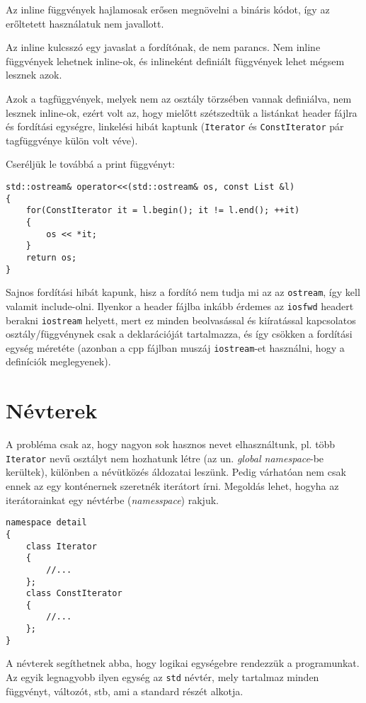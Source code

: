 \documentclass[a4paper,11.5pt,table]{article}
\begin{document}
	\begin{note}
		Az inline függvények hajlamosak erősen megnövelni a bináris kódot, így az erőltetett használatuk nem javallott.
	\end{note}
	\begin{note}
		Az inline kulcsszó egy javaslat a fordítónak, de nem parancs. Nem inline függvények lehetnek inline-ok, és inlineként definiált függvények lehet mégsem lesznek azok.
	\end{note}
	Azok a tagfüggvények, melyek nem az osztály törzsében vannak definiálva, nem lesznek inline-ok, ezért volt az, hogy mielőtt szétszedtük a listánkat header fájlra és fordítási egységre, linkelési hibát kaptunk (\texttt{Iterator} és \texttt{ConstIterator} pár tagfüggvénye külön volt véve).
	\medskip
	
	Cseréljük le továbbá a print függvényt:
	
	\begin{lstlisting}
std::ostream& operator<<(std::ostream& os, const List &l)
{
	for(ConstIterator it = l.begin(); it != l.end(); ++it)
	{
		os << *it;
	}
	return os;
}
	\end{lstlisting}
	Sajnos fordítási hibát kapunk, hisz a fordító nem tudja mi az az \texttt{ostream}, így kell valamit include-olni. Ilyenkor a header fájlba inkább érdemes az \texttt{iosfwd} headert berakni \texttt{iostream} helyett, mert ez minden beolvasással és kiíratással kapcsolatos osztály/függvénynek csak a deklarációját tartalmazza, és így csökken a fordítási egység méretéte (azonban a cpp fájlban muszáj \texttt{iostream}-et használni, hogy a definíciók meglegyenek).
	\section{Névterek}
	
	A probléma csak az, hogy nagyon sok hasznos nevet elhasználtunk, pl. több \texttt{Iterator} nevű osztályt nem hozhatunk létre (az un. \textit{global namespace}-be kerültek), különben a névütközés áldozatai leszünk. Pedig várhatóan nem csak ennek az egy konténernek szeretnék iterátort írni. Megoldás lehet, hogyha az iterátorainkat egy névtérbe (\textit{namesspace}) rakjuk.
\begin{lstlisting}
namespace detail
{
	class Iterator
	{
		//...
	};
	class ConstIterator
	{
		//...
	};
}
\end{lstlisting}
	A névterek segíthetnek abba, hogy logikai egységebre rendezzük a programunkat. Az egyik legnagyobb ilyen egység az \texttt{std} névtér, mely tartalmaz minden függvényt, változót, stb, ami a standard részét alkotja. 
	
\end{document}
